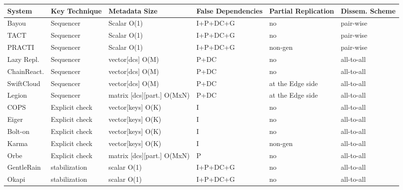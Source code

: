 \begin{center}
    \begin{table}
    \begin{tabular}{ |m{5em}||m{5em}|m{5em}|m{5em}|m{4em}|m{5em}| } 
        \hline
        System & Key Technique & Metadata Size & False Dependencies & Partial Replication & Dissem. Scheme \\ 
        \hline
        Bayou & Sequencer & Scalar O(1) & I+P+DC+G & no & pair-wise \\ 
        \hline
        TACT & Sequencer & Scalar O(1) & I+P+DC+G & no & pair-wise \\ 
        \hline
        PRACTI & Sequencer & Scalar O(1) & I+P+DC+G & non-gen & pair-wise \\ 
        \hline
        Lazy Repl. & Sequencer & vector[dcs] O(M) & P+DC & no & all-to-all \\ 
        \hline
        ChainReact. & Sequencer & vector[dcs] O(M) & P+DC & no & all-to-all \\ 
        \hline
        SwiftCloud & Sequencer & vector[dcs] O(M) & P+DC & at the Edge side & all-to-all \\ 
        \hline
        Legion & Sequencer & matrix [dcs][part.] O(MxN) & P+DC & at the Edge side & all-to-all \\ 
        \hline
        COPS & Explicit check & vector[keys] O(K) & I & no & all-to-all \\ 
        \hline
        Eiger & Explicit check & vector[keys] O(K) & I & no & all-to-all \\ 
        \hline
        Bolt-on & Explicit check & vector[keys] O(K) & I & no & all-to-all \\ 
        \hline
        Karma & Explicit check & vector[keys] O(K) & I & non-gen & all-to-all \\ 
        \hline
        Orbe & Explicit check & matrix [dcs][part.] O(MxN) & P & no & all-to-all \\ 
        \hline
        GentleRain & stabilization & scalar O(1) & I+P+DC+G & no & all-to-all \\ 
        \hline
        Okapi & stabilization & scalar O(1) & I+P+DC+G & no & all-to-all \\ 

\end{tabular}
\end{table}
\end{center}
